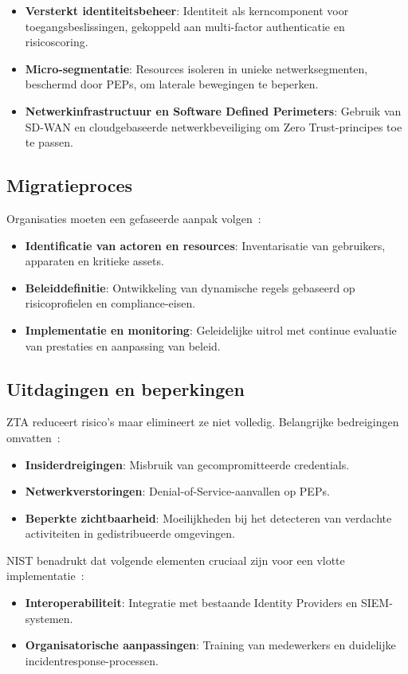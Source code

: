 \begin{itemize}
  \item \textbf{Versterkt identiteitsbeheer}: Identiteit als kerncomponent voor toegangsbeslissingen, gekoppeld aan multi-factor authenticatie en risicoscoring.  
  \item \textbf{Micro-segmentatie}: Resources isoleren in unieke netwerksegmenten, beschermd door PEPs, om laterale bewegingen te beperken.  
  \item \textbf{Netwerkinfrastructuur en Software Defined Perimeters}: Gebruik van SD-WAN en cloudgebaseerde netwerkbeveiliging om Zero Trust-principes toe te passen.  
\end{itemize}

\subsection{Migratieproces}
Organisaties moeten een gefaseerde aanpak volgen~\autocite{NIST2020}:  
\begin{itemize}
  \item \textbf{Identificatie van actoren en resources}: Inventarisatie van gebruikers, apparaten en kritieke assets.  
  \item \textbf{Beleiddefinitie}: Ontwikkeling van dynamische regels gebaseerd op risicoprofielen en compliance-eisen.  
  \item \textbf{Implementatie en monitoring}: Geleidelijke uitrol met continue evaluatie van prestaties en aanpassing van beleid.  
\end{itemize}

\subsection{Uitdagingen en beperkingen}
ZTA reduceert risico’s maar elimineert ze niet volledig. Belangrijke bedreigingen omvatten~\autocite{NIST2020}:  
\begin{itemize}
  \item \textbf{Insiderdreigingen}: Misbruik van gecompromitteerde credentials.  
  \item \textbf{Netwerkverstoringen}: Denial-of-Service-aanvallen op PEPs.  
  \item \textbf{Beperkte zichtbaarheid}: Moeilijkheden bij het detecteren van verdachte activiteiten in gedistribueerde omgevingen.  
\end{itemize}

NIST benadrukt dat volgende elementen cruciaal zijn voor een vlotte implementatie~\autocite{NIST2020}:  
\begin{itemize}
  \item \textbf{Interoperabiliteit}: Integratie met bestaande Identity Providers en SIEM-systemen.  
  \item \textbf{Organisatorische aanpassingen}: Training van medewerkers en duidelijke incidentresponse-processen.
\end{itemize}

